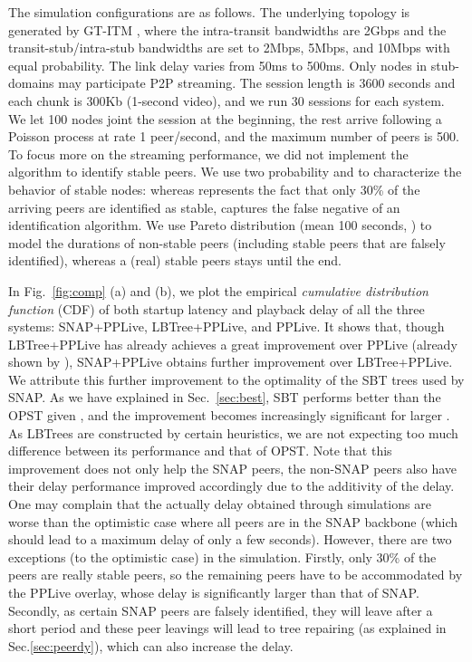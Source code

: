 \documentclass[conference]{IEEEtran}
\begin{document}
  The simulation configurations are as follows. The underlying topology is generated by GT-ITM \cite{itm}, where the intra-transit bandwidths are 2Gbps and the transit-stub/intra-stub bandwidths are set to 2Mbps, 5Mbps, and 10Mbps with equal probability. The link delay varies from 50ms to 500ms. Only nodes in stub-domains may participate P2P streaming. The session length is 3600 seconds and each chunk is 300Kb (1-second video), and we run 30 sessions for each system. We let 100 nodes joint the session at the beginning, the rest arrive following a Poisson process at rate 1 peer/second, and the maximum number of peers is 500. To focus more on the streaming performance, we did not implement the algorithm to identify stable peers. We use two probability  and  to characterize the behavior of stable nodes: whereas  represents the fact that only 30\% of the arriving peers are identified as stable,  captures the false negative of an identification algorithm. We use Pareto distribution (mean 100 seconds, ) to model the durations of non-stable peers (including stable peers that are falsely identified), whereas a (real) stable peers stays until the end.

  In Fig.~\ref{fig:comp} (a) and (b), we plot the empirical \textit{cumulative distribution function} (CDF) of both startup latency and playback delay of all the three systems: SNAP+PPLive, LBTree+PPLive, and PPLive. It shows that, though LBTree+PPLive has already achieves a great improvement over PPLive (already shown by \cite{WangLX-INFOCOM08}), SNAP+PPLive obtains further improvement over LBTree+PPLive. We attribute this further improvement to the optimality of the SBT trees used by SNAP. As we have explained in Sec.~\ref{sec:best}, SBT performs better than the OPST given , and the improvement becomes increasingly significant for larger . As LBTrees are constructed by certain heuristics, we are not expecting too much difference between its performance and that of OPST. Note that this improvement does not only help the SNAP peers, the non-SNAP peers also have their delay performance improved accordingly due to the additivity of the delay. One may complain that the actually delay obtained through simulations are worse than the optimistic case where all peers are in the SNAP backbone (which should lead to a maximum delay of only a few seconds). However, there are two exceptions (to the optimistic case) in the simulation. Firstly, only 30\% of the peers are really stable peers, so the remaining peers have to be accommodated by the PPLive overlay, whose delay is significantly larger than that of SNAP. Secondly, as certain SNAP peers are falsely identified, they will leave after a short period and these peer leavings will lead to tree repairing (as explained in Sec.\ref{sec:peerdy}), which can also increase the delay.
\end{document}

